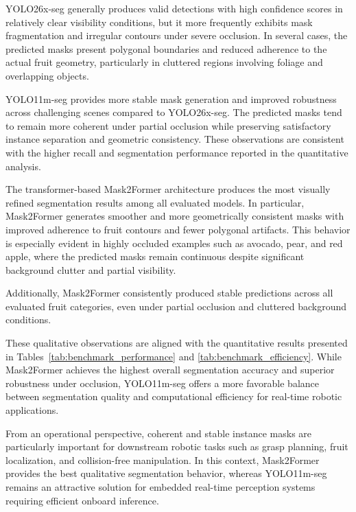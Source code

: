 \documentclass[runningheads]{llncs}
\begin{document}
YOLO26x-seg generally produces valid detections with high confidence scores in
relatively clear visibility conditions, but it more frequently exhibits mask
fragmentation and irregular contours under severe occlusion. In several cases,
the predicted masks present polygonal boundaries and reduced adherence to the
actual fruit geometry, particularly in cluttered regions involving foliage and
overlapping objects.

YOLO11m-seg provides more stable mask generation and improved robustness across
challenging scenes compared to YOLO26x-seg. The predicted masks tend to remain
more coherent under partial occlusion while preserving satisfactory instance
separation and geometric consistency. These observations are consistent with the
higher recall and segmentation performance reported in the quantitative analysis.

The transformer-based Mask2Former architecture produces the most visually
refined segmentation results among all evaluated models. In particular,
Mask2Former generates smoother and more geometrically consistent masks with
improved adherence to fruit contours and fewer polygonal artifacts. This
behavior is especially evident in highly occluded examples such as avocado,
pear, and red apple, where the predicted masks remain continuous despite
significant background clutter and partial visibility.

Additionally, Mask2Former consistently produced stable predictions across all evaluated fruit categories, even under partial occlusion and cluttered background conditions.

These qualitative observations are aligned with the quantitative results
presented in Tables~\ref{tab:benchmark_performance} and
\ref{tab:benchmark_efficiency}. While Mask2Former achieves the highest overall
segmentation accuracy and superior robustness under occlusion, YOLO11m-seg
offers a more favorable balance between segmentation quality and computational
efficiency for real-time robotic applications.

From an operational perspective, coherent and stable instance masks are
particularly important for downstream robotic tasks such as grasp planning,
fruit localization, and collision-free manipulation. In this context,
Mask2Former provides the best qualitative segmentation behavior, whereas
YOLO11m-seg remains an attractive solution for embedded real-time perception
systems requiring efficient onboard inference.
\end{document}
